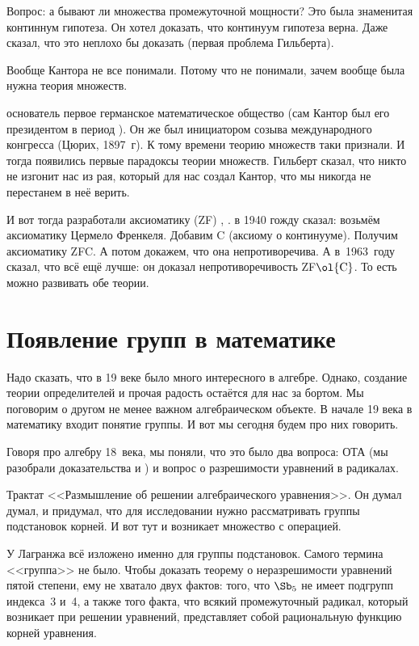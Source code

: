 \documentclass[a4paper,oneside,fleqn,10pt]{article}
\begin{document}
Вопрос: а бывают ли множества промежуточной мощности? Это была знаменитая континнум гипотеза.
Он хотел доказать, что континуум гипотеза верна. Даже  сказал, что это неплохо бы
доказать (первая проблема Гильберта).

Вообще Кантора не все понимали. Потому что не понимали, зачем вообще была нужна теория множеств.

 основатель первое германское математическое общество (сам Кантор был его
президентом в период ).
Он же был инициатором созыва международного конгресса (Цюрих, 1897~г).
К тому времени теорию множеств таки признали. И тогда появились первые парадоксы
теории множеств. Гильберт сказал, что никто не изгонит нас из рая, который для нас создал Кантор,
что мы никогда не перестанем в неё верить.

И вот тогда разработали аксиоматику (ZF) , .
 в 1940 гожду сказал: возьмём аксиоматику Цермело Френкеля.
Добавим C (аксиому о континууме). Получим аксиоматику ZFC.
А потом докажем, что она непротиворечива.
А в~1963~году  сказал, что всё ещё лучше:
он доказал непротиворечивость ZF$\ol{\rm C}$.
То есть можно развивать обе теории.


\section{Появление групп в математике}

Надо сказать, что в 19 веке было много интересного в алгебре.
Однако, создание теории определителей и прочая радость остаётся для нас за бортом.
Мы поговорим о другом не менее важном алгебраическом объекте.
В начале 19 века в математику входит понятие группы. И вот мы сегодня будем
про них говорить.

Говоря про алгебру 18~века, мы поняли, что это было два вопроса: ОТА (мы разобрали доказательства 
и ) и вопрос о разрешимости уравнений в радикалах.

Трактат   <<Размышление об решении алгебраического уравнения>>.
Он думал думал, и придумал, что для исследовании нужно рассматривать группы подстановок
корней. И вот тут и возникает множество с операцией.

У Лагранжа всё изложено именно для группы подстановок. Самого термина <<группа>> не было.
Чтобы доказать теорему о неразрешимости уравнений пятой степени, ему
не хватало двух фактов: того, что $\Sb_5$ не имеет подгрупп индекса~3 и~4,
а также того факта, что всякий промежуточный радикал, который возникает при решении
уравнений, представляет собой рациональную функцию корней уравнения.
\end{document}
